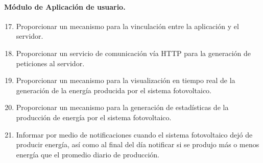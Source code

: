 \paragraph{Módulo de Aplicación de usuario.}
\begin{enumerate}[label=RF\arabic*.]
	\setcounter{enumi}{16}
	\item Proporcionar un mecanismo para la vinculación entre la aplicación y el servidor.
	\item Proporcionar un servicio de comunicación vía HTTP para la generación de peticiones al servidor.
	\item Proporcionar un mecanismo para la visualización en tiempo real de la generación  de la energía producida por el sistema fotovoltaico.
	\item Proporcionar un mecanismo para la generación de estadísticas de la producción de energía por el sistema fotovoltaico.
	\item Informar por medio de notificaciones cuando el sistema fotovoltaico dejó de producir energía, así como al final del día notificar si se produjo más o menos energía que el promedio diario de producción.  
\end{enumerate}